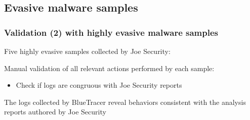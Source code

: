 \documentclass[compress]{beamer}
\begin{document}
\subsection{Evasive malware samples}
\begin{frame}
    \frametitle{Validation (2) with highly evasive malware samples}
    
	Five highly evasive samples collected by Joe Security:    
    
    \begin{table}[h]
\vspace*{-0.1cm}
\begin{center}
\end{center}
\end{table}
\vspace{-0.1cm}
Manual validation of all relevant actions performed by each sample:
\vspace{-0.5cm}
\begin{itemize}
\item Check if logs are congruous with Joe Security reports
\end{itemize}
\medskip
\begin{beamerboxesrounded}[shadow=true]{}
The
logs collected by BlueTracer reveal behaviors consistent with the analysis reports
authored by Joe Security
\end{beamerboxesrounded}	

\end{frame}
\end{document}
